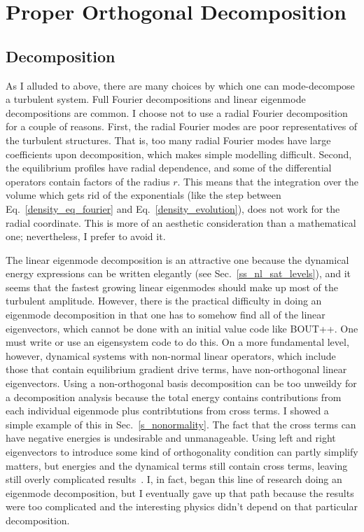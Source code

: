 \section{Proper Orthogonal Decomposition}
\label{s_pod}

\subsection{Decomposition}
\label{ss_pod_decomp}

As I alluded to above, there are many choices by which one can mode-decompose a turbulent system. Full Fourier decompositions and linear eigenmode decompositions are common. I choose
not to use a radial Fourier decomposition for a couple of reasons. First, the radial Fourier modes are poor representatives of the turbulent structures. 
That is, too many radial Fourier modes have large coefficients upon decomposition, which makes simple modelling difficult. Second, the equilibrium profiles have radial dependence,
and some of the differential operators contain factors of the radius $r$. This means that the integration over the volume which gets rid of the exponentials 
(like the step between Eq.~\ref{density_eq_fourier} and Eq.~\ref{density_evolution}), does not work for the radial coordinate. This is more of an aesthetic consideration than a mathematical one;
nevertheless, I prefer to avoid it.

The linear eigenmode decomposition is an attractive one because the dynamical energy expressions can be written elegantly (see Sec.~\ref{ss_nl_sat_levels}), and it seems that the fastest growing
linear eigenmodes should make up most of the turbulent amplitude. 
However, there is the practical difficulty in doing an eigenmode decomposition in that one has to somehow find all of the linear eigenvectors, 
which cannot be done with an initial value code like BOUT++. One must write or use an eigensystem code to do this. 
On a more fundamental level, however, dynamical systems with non-normal linear operators, which include those that contain equilibrium gradient drive terms,
have non-orthogonal linear eigenvectors. Using a non-orthogonal basis decomposition can be too unweildy for a decomposition analysis because the total energy 
contains contributions from each individual eigenmode plus contribtutions from cross terms. I showed a simple example of this in Sec.~\ref{s_nonormality}. 
The fact that the cross terms can have negative energies is undesirable and unmanageable. Using left and right eigenvectors to introduce some kind of orthogonality condition can
partly simplify matters, but energies and the dynamical terms still contain cross terms, leaving still overly complicated results~\cite{kim2010}.
I, in fact, began this line of research doing an eigenmode decomposition, but I eventually
gave up that path because the results were too complicated and the interesting physics didn't depend on that particular decomposition.

